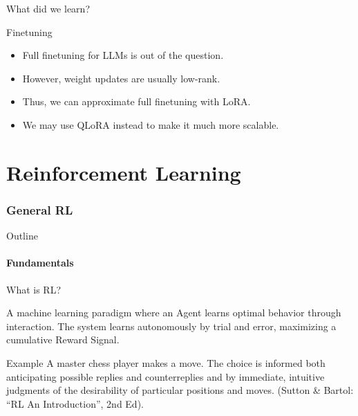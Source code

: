 \documentclass[24pt]{beamer}
\newcommand{\partslide}{
	\begin{frame}
		\partpage
	\end{frame}
}
\newcommand{\sectionslide}{
	\begin{frame}{Outline}
		\tableofcontents[currentsection]
	\end{frame}
}
\newcommand{\subsectionslide}{
	\begin{frame}
		\sectionpage
		\subsectionpage
	\end{frame}
}
\begin{document}
\begin{frame}{What did we learn?}
	\begin{block}{Finetuning}
		\begin{itemize}
			\item Full finetuning for LLMs is out of the question. \item
			However, weight updates are usually \alert{low-rank}. \item Thus, we
			can \alert{approximate} full finetuning with LoRA. \item We may use
			QLoRA instead to make it much more \alert{scalable}.
		\end{itemize}
	\end{block}
\end{frame}

  
\part{Reinforcement Learning}
\partslide

\section{General RL}
\sectionslide

\subsection{Fundamentals}
\subsectionslide

\begin{frame}{What is RL?}
	\begin{definition}
		A machine learning paradigm where an Agent \alert{learns} optimal behavior through \alert{interaction}. The system learns autonomously by trial and error, maximizing a cumulative \alert{Reward Signal}.
	\end{definition}
	
	\begin{exampleblock}{Example}
		A master chess player makes a move. The choice is informed both anticipating possible replies and counterreplies and by immediate, intuitive judgments of the desirability of particular positions and moves. (Sutton \& Bartol: ``RL An Introduction'', 2nd Ed).
	\end{exampleblock}
\end{frame}
\end{document}
